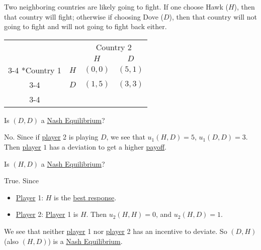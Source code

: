 \begin{eg}\label{def:Hawk-Dove}
	Two neighboring countries are likely going to fight. If one choose Hawk (\(H\)), then that country will fight; otherwise if choosing Dove (\(D\)), then that country will not going to fight and will not going to fight back either.
	\begin{table}[H]
		\centering
		\setlength{\extrarowheight}{2pt}
		\begin{tabular}{cc|c|c|}
			                         & \multicolumn{1}{c}{} & \multicolumn{2}{c}{Country 2}                           \\
			                         & \multicolumn{1}{c}{} & \multicolumn{1}{c}{$H$}       & \multicolumn{1}{c}{$D$} \\\cline{3-4}
			\multirow{2}*{Country 1} & $H$                  & $(0, 0)$                      & $(5, 1)$                \\\cline{3-4}
			                         & $D$                  & $(1, 5)$                      & $(3, 3)$                \\\cline{3-4}
		\end{tabular}
	\end{table}
	\begin{problem}
	Is \((D, D)\) a \hyperref[def:Nash-equilibrium]{Nash Equilibrium}?
	\end{problem}
	\begin{answer}
		No. Since if \hyperref[def:player]{player} 2 is playing \(D\), we see that \(u_1(H, D) = 5\), \(u_1(D, D) = 3\). Then \hyperref[def:player]{player} \(1\) has a deviation to get a higher \hyperref[def:reward]{payoff}.
	\end{answer}
	\begin{problem}
	Is \((H, D)\) a \hyperref[def:Nash-equilibrium]{Nash Equilibrium}?
	\end{problem}
	\begin{answer}
		True. Since
		\begin{itemize}
			\item \hyperref[def:player]{Player} 1: \(H\) is the \hyperref[def:best-response]{best response}.
			\item \hyperref[def:player]{Player} 2: \hyperref[def:player]{Player} 1 is \(H\). Then \(u_2(H, H) = 0\), and \(u_2(H, D) = 1\).
		\end{itemize}
		We see that neither \hyperref[def:player]{player} 1 nor \hyperref[def:player]{player} 2 has an incentive to deviate. So \((D, H)\) (also \((H, D)\)) is a \hyperref[def:Nash-equilibrium]{Nash Equilibrium}.
	\end{answer}
\end{eg}

